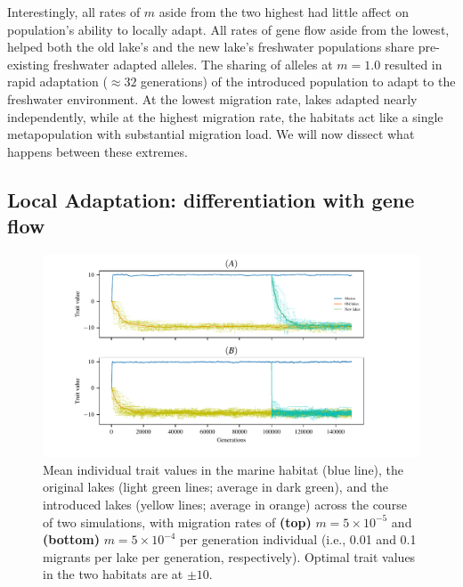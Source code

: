\documentclass{article}
\begin{document}
Interestingly, all rates of $m$ aside from the two highest had little affect on population's ability to locally adapt.
All rates of gene flow aside from the lowest, helped both the old lake's and the new lake's freshwater populations share pre-existing freshwater adapted alleles.
The sharing of alleles at $m = 1.0$ resulted in rapid adaptation ($\approx 32$ generations) of the introduced population to adapt to the freshwater environment.
At the lowest migration rate, lakes adapted nearly independently,
while at the highest migration rate, the habitats act like a single metapopulation
with substantial migration load.
We will now dissect what happens between these extremes.

\subsection*{Local Adaptation: differentiation with gene flow}

\begin{figure}
	\begin{center}
        \includegraphics{Final_Plots/Pheno_Time.pdf}
  		\caption{ 
        		Mean individual trait values in the marine habitat (blue line),
        		the original lakes (light green lines; average in dark green),
        		and the introduced lakes (yellow lines; average in orange)
        		across the course of two simulations, with migration rates of
        		\textbf{(top)} $m=5 \times 10^{-5}$ and
        		\textbf{(bottom)} $m=5 \times 10^{-4}$ per generation individual
        		(i.e., 0.01 and 0.1 migrants per lake per generation, respectively).
        		Optimal trait values in the two habitats are at $\pm 10$.
		}
  		\label{fig:phenotype_ts2}
	\end{center}
\end{figure}
\end{document}
